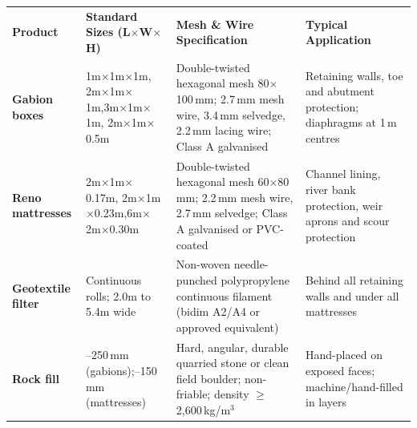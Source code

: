 \documentclass[a4paper,11pt]{article}
\begin{document}
\renewcommand{\arraystretch}{1.22}
\noindent
\begin{tabularx}{\textwidth}{@{}p{2.5cm} p{3.3cm} X p{4.2cm}@{}}
\rowcolor{mhnavy}
{\color{white}\bfseries\fontsize{7.6pt}{9.2pt}\selectfont Product} &
{\color{white}\bfseries\fontsize{7.6pt}{9.2pt}\selectfont Standard Sizes (L$\times$W$\times$H)} &
{\color{white}\bfseries\fontsize{7.6pt}{9.2pt}\selectfont Mesh \& Wire Specification} &
{\color{white}\bfseries\fontsize{7.6pt}{9.2pt}\selectfont Typical Application} \\
\rowcolor{mhbluelight}
\fontsize{7.3pt}{9.0pt}\selectfont\bfseries Gabion boxes & \fontsize{7.3pt}{9.0pt}\selectfont 1m$\times$1m$\times$1m, 2m$\times$1m$\times$1m,\newline 3m$\times$1m$\times$1m, 2m$\times$1m$\times$0.5m & \fontsize{7.3pt}{9.0pt}\selectfont Double-twisted hexagonal mesh 80$\times$100\,mm; 2.7\,mm mesh wire, 3.4\,mm selvedge, 2.2\,mm lacing wire; Class A galvanised & \fontsize{7.3pt}{9.0pt}\selectfont Retaining walls, toe and abutment protection; diaphragms at 1\,m centres \\
\fontsize{7.3pt}{9.0pt}\selectfont\bfseries Reno mattresses & \fontsize{7.3pt}{9.0pt}\selectfont 2m$\times$1m$\times$0.17m, 2m$\times$1m$\times$0.23m,\newline 6m$\times$2m$\times$0.30m & \fontsize{7.3pt}{9.0pt}\selectfont Double-twisted hexagonal mesh 60$\times$80\,mm; 2.2\,mm mesh wire, 2.7\,mm selvedge; Class A galvanised or PVC-coated & \fontsize{7.3pt}{9.0pt}\selectfont Channel lining, river bank protection, weir aprons and scour protection \\
\rowcolor{mhbluelight}
\fontsize{7.3pt}{9.0pt}\selectfont\bfseries Geotextile filter & \fontsize{7.3pt}{9.0pt}\selectfont Continuous rolls; 2.0m to 5.4m wide & \fontsize{7.3pt}{9.0pt}\selectfont Non-woven needle-punched polypropylene continuous filament (bidim A2/A4 or approved equivalent) & \fontsize{7.3pt}{9.0pt}\selectfont Behind all retaining walls and under all mattresses \\
\fontsize{7.3pt}{9.0pt}\selectfont\bfseries Rock fill & \fontsize{7.3pt}{9.0pt}\selectfont 100--250\,mm (gabions);\newline 75--150\,mm (mattresses) & \fontsize{7.3pt}{9.0pt}\selectfont Hard, angular, durable quarried stone or clean field boulder; non-friable; density $\geq$ 2,600\,kg/m$^3$ & \fontsize{7.3pt}{9.0pt}\selectfont Hand-placed on exposed faces; machine/hand-filled in layers \\
\end{tabularx}
\renewcommand{\arraystretch}{1}
\end{document}
